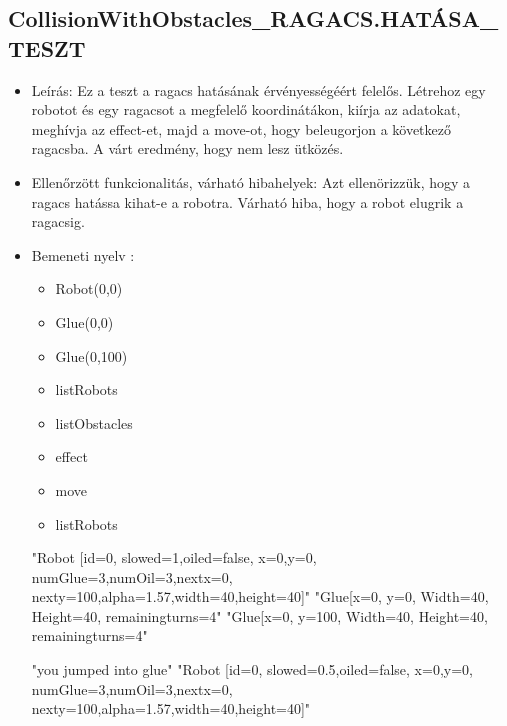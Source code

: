 \subsection{CollisionWithObstacles\_RAGACS.HATÁSA\_TESZT}
\begin{itemize}
	\item Leírás: Ez a teszt a ragacs hatásának érvényességéért felelős. Létrehoz egy robotot és egy ragacsot a megfelelő koordinátákon, kiírja az adatokat, meghívja az effect-et, majd a move-ot, hogy beleugorjon a következő ragacsba. A várt eredmény, hogy nem lesz ütközés.
\newline
	\item  Ellenőrzött funkcionalitás, várható hibahelyek: Azt ellenörizzük, hogy a ragacs hatássa kihat-e a robotra.
		   Várható hiba, hogy a robot elugrik a ragacsig.
	\item Bemeneti nyelv :
		\begin{itemize}
		\item Robot(0,0)
		\item Glue(0,0)
		\item Glue(0,100)
		\item listRobots
		\item listObstacles
		\item effect
		\item move
		\item listRobots
		\end{itemize}
	
		"Robot [id=0,  slowed=1,oiled=false, x=0,y=0, 
		\\numGlue=3,numOil=3,nextx=0,
		\\nexty=100,alpha=1.57,width=40,height=40]"\newline
		"Glue[x=0, y=0, Width=40, Height=40, remainingturns=4"\newline
			"Glue[x=0, y=100, Width=40, Height=40, remainingturns=4"\newline
			
			"you jumped into glue"\newline
				"Robot [id=0,  slowed=0.5,oiled=false, x=0,y=0, 
		\\numGlue=3,numOil=3,nextx=0,
		\\nexty=100,alpha=1.57,width=40,height=40]"\newline
		
\end{itemize}


